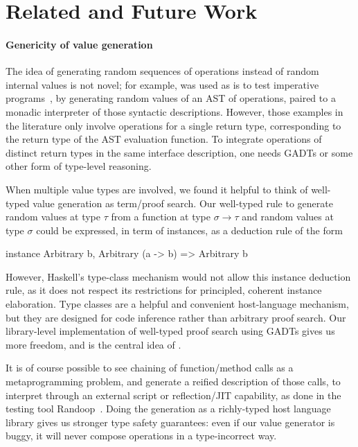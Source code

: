 \section{Related and Future Work}

\paragraph{Genericity of value generation}

The idea of generating random sequences of operations instead of
random internal values is not novel; for example, \qcheck was used as
is to test imperative
programs~\cite{DBLP:journals/sigplan/ClaessenH02}, by generating
random values of an AST of operations, paired to a monadic interpreter
of those syntactic descriptions. However, those examples in the
literature only involve operations for a single return type,
corresponding to the return type of the AST evaluation function. To
integrate operations of distinct return types in the same interface
description, one needs GADTs or some other form of type-level
reasoning.

When multiple value types are involved, we found it helpful to think
of well-typed value generation as term/proof search. Our well-typed
rule to generate random values at type $\tau$ from a function at type
$\sigma \to \tau$ and random values at type $\sigma$ could be
expressed, in term of \qcheck {} instances, as
a deduction rule of the form\vspace{-0.3em}
%
\begin{haskellcode}
instance Arbitrary b, Arbitrary (a -> b) => Arbitrary b
\end{haskellcode}
\vspace{-0.3em}
%
However, Haskell's type-class mechanism would not allow this instance
deduction rule, as it does not respect its restrictions for
principled, coherent instance elaboration. Type classes are a helpful
and convenient host-language mechanism, but they are designed for code
inference rather than arbitrary proof search. Our library-level
implementation of well-typed proof search using GADTs gives us more
freedom, and is the central idea of \arti.

It is of course possible to see chaining of function/method calls as
a metaprogramming problem, and generate a reified description of those
calls, to interpret through an external script or reflection/JIT
capability, as done in the testing tool
Randoop~\cite{DBLP:conf/oopsla/PachecoE07}. Doing the generation as
a richly-typed host language library gives us stronger type safety
guarantees: even if our value generator is buggy, it will never
compose operations in a type-incorrect way.

